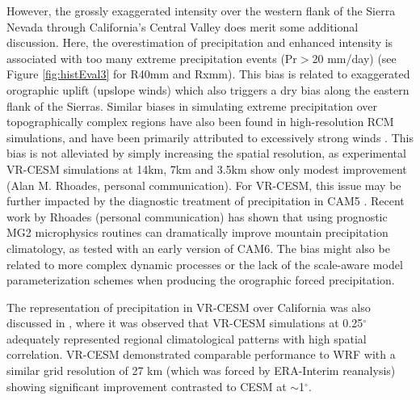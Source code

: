 \documentclass{ametsoc}
\begin{document}
However, the grossly exaggerated intensity over the western flank of the Sierra Nevada through California's Central Valley does merit some additional discussion. Here, the overestimation of precipitation and enhanced intensity is associated with too many extreme precipitation events (Pr$>$20 mm/day) (see Figure \ref{fig:histEval3} for R40mm and Rxmm).  This bias is related to exaggerated orographic uplift (upslope winds) which also triggers a dry bias along the eastern flank of the Sierras.  Similar biases in simulating extreme precipitation over topographically complex regions have also been found in high-resolution RCM simulations, and have been primarily attributed to excessively strong winds \citep{walker2009evaluation, singh2013precipitation}.  This bias is not alleviated by simply increasing the spatial resolution, as experimental VR-CESM simulations at 14km, 7km and 3.5km show only modest improvement (Alan M. Rhoades, personal communication). For VR-CESM, this issue may be further impacted by the diagnostic treatment of precipitation in CAM5 \citep{morrison2008new, gettelman2008new}. Recent work by Rhoades (personal communication) has shown that using prognostic MG2 microphysics routines can dramatically improve mountain precipitation climatology, as tested with an early version of CAM6. The bias might also be related to more complex dynamic processes or the lack of the scale-aware model parameterization schemes when producing the orographic forced precipitation.

The representation of precipitation in VR-CESM over California was also discussed in \cite{huang2016evaluation}, where it was observed that VR-CESM simulations at 0.25$^\circ$ adequately represented regional climatological patterns with high spatial correlation. VR-CESM demonstrated comparable performance to WRF with a similar grid resolution of 27 km (which was forced by ERA-Interim reanalysis) showing significant improvement contrasted to CESM at $\sim$1$^\circ$.

\end{document}
